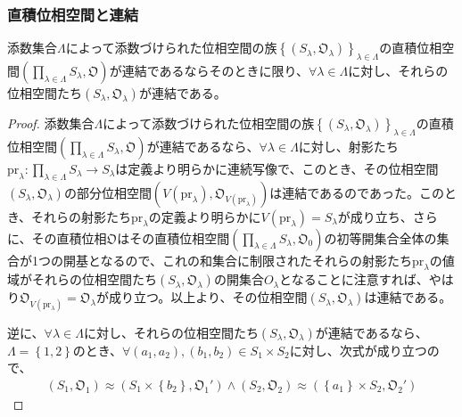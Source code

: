 \documentclass[dvipdfmx]{jsarticle}
\begin{document}
\subsubsection{直積位相空間と連結}%
\begin{thm}\label{8.1.5.11}
添数集合$\varLambda$によって添数づけられた位相空間の族$\left\{ \left( S_{\lambda},\mathfrak{O}_{\lambda} \right) \right\}_{\lambda \in \varLambda}$の直積位相空間$\left( \prod_{\lambda \in \varLambda} S_{\lambda},\mathfrak{O} \right)$が連結であるならそのときに限り、$\forall\lambda \in \varLambda$に対し、それらの位相空間たち$\left( S_{\lambda},\mathfrak{O}_{\lambda} \right)$が連結である。
\end{thm}
\begin{proof}
添数集合$\varLambda$によって添数づけられた位相空間の族$\left\{ \left( S_{\lambda},\mathfrak{O}_{\lambda} \right) \right\}_{\lambda \in \varLambda}$の直積位相空間$\left( \prod_{\lambda \in \varLambda} S_{\lambda},\mathfrak{O} \right)$が連結であるなら、$\forall\lambda \in \varLambda$に対し、射影たち${\mathrm{pr}}_{\lambda}:\prod_{\lambda \in \varLambda} S_{\lambda} \rightarrow S_{\lambda}$は定義より明らかに連続写像で、このとき、その位相空間$\left( S_{\lambda},\mathfrak{O}_{\lambda} \right)$の部分位相空間$\left( V\left( {\mathrm{pr}}_{\lambda} \right),\mathfrak{O}_{V\left( {\mathrm{pr}}_{\lambda} \right)} \right)$は連結であるのであった。このとき、それらの射影たち${\mathrm{pr}}_{\lambda}$の定義より明らかに$V\left( {\mathrm{pr}}_{\lambda} \right) = S_{\lambda}$が成り立ち、さらに、その直積位相$\mathfrak{O}$はその直積位相空間$\left( \prod_{\lambda \in \varLambda} S_{\lambda},\mathfrak{O}_{0} \right)$の初等開集合全体の集合が1つの開基となるので、これの和集合に制限されたそれらの射影たち${\mathrm{pr}}_{\lambda}$の値域がそれらの位相空間たち$\left( S_{\lambda},\mathfrak{O}_{\lambda} \right)$の開集合$O_{\lambda}$となることに注意すれば、やはり$\mathfrak{O}_{V\left( {\mathrm{pr}}_{\lambda} \right)} = \mathfrak{O}_{\lambda}$が成り立つ。以上より、その位相空間$\left( S_{\lambda},\mathfrak{O}_{\lambda} \right)$は連結である。\par
逆に、$\forall\lambda \in \varLambda$に対し、それらの位相空間たち$\left( S_{\lambda},\mathfrak{O}_{\lambda} \right)$が連結であるなら、$\varLambda = \left\{ 1,2 \right\}$のとき、$\forall\left( a_{1},a_{2} \right),\left( b_{1},b_{2} \right) \in S_{1} \times S_{2}$に対し、次式が成り立つので、
\begin{align*}
\left( S_{1},\mathfrak{O}_{1} \right) \approx \left( S_{1} \times \left\{ b_{2} \right\},\mathfrak{O}_{1}' \right) \land \left( S_{2},\mathfrak{O}_{2} \right) \approx \left( \left\{ a_{1} \right\} \times S_{2},\mathfrak{O}_{2}' \right)

\end{align*}
\end{proof}
\end{document}
